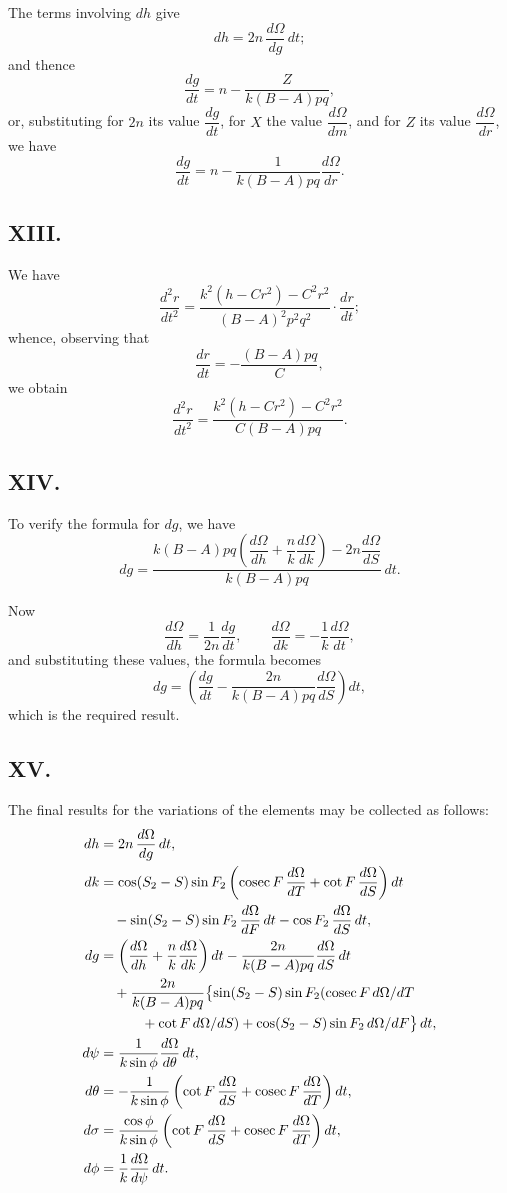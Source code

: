 \documentclass[11pt,a4paper]{article}
\DeclareMathOperator{\cosec}{cosec}
\begin{document}
The terms involving $dh$ give
\[
dh = 2n\,\frac{d\Omega}{dg}\,dt;
\]
and thence
\[
\frac{dg}{dt} = n - \frac{Z}{k(B-A)pq},
\]
or, substituting for $2n$ its value $\dfrac{dg}{dt}$, for $X$ the value $\dfrac{d\Omega}{dm}$, and for $Z$ its value $\dfrac{d\Omega}{dr}$, we have
\[
\frac{dg}{dt} = n - \frac{1}{k(B-A)pq}\frac{d\Omega}{dr}.
\]

\subsection*{XIII.}

We have
\[
\frac{d^2r}{dt^2} = \frac{k^2(h-Cr^2)-C^2r^2}{(B-A)^2p^2q^2}\cdot\frac{dr}{dt};
\]
whence, observing that
\[
\frac{dr}{dt} = -\frac{(B-A)pq}{C},
\]
we obtain
\[
\frac{d^2r}{dt^2} = \frac{k^2(h-Cr^2)-C^2r^2}{C(B-A)pq}.
\]

\subsection*{XIV.}

To verify the formula for $dg$, we have
\[
dg = \frac{k(B-A)pq\left(\dfrac{d\Omega}{dh} + \dfrac{n}{k}\dfrac{d\Omega}{dk}\right) - 2n\dfrac{d\Omega}{dS}}{k(B-A)pq}\,dt.
\]

Now
\[
\frac{d\Omega}{dh} = \frac{1}{2n}\frac{dg}{dt}, \qquad \frac{d\Omega}{dk} = -\frac{1}{k}\frac{d\Omega}{dt},
\]
and substituting these values, the formula becomes
\[
dg = \left(\frac{dg}{dt} - \frac{2n}{k(B-A)pq}\frac{d\Omega}{dS}\right)dt,
\]
which is the required result.

\subsection*{XV.}

The final results for the variations of the elements may be collected as follows:
\begin{align}
dh &= 2n\,\frac{d\Omega}{dg}\,dt, \\
dk &= \cos(S_2-S)\sin F_2\left(\cosec F\,\frac{d\Omega}{dT} + \cot F\,\frac{d\Omega}{dS}\right)dt \notag\\
&\quad - \sin(S_2-S)\sin F_2\,\frac{d\Omega}{dF}\,dt - \cos F_2\,\frac{d\Omega}{dS}\,dt, \\
dg &= \left(\frac{d\Omega}{dh} + \frac{n}{k}\frac{d\Omega}{dk}\right)dt - \frac{2n}{k(B-A)pq}\frac{d\Omega}{dS}\,dt \notag\\
&\quad + \frac{2n}{k(B-A)pq}\bigl\{\sin(S_2-S)\sin F_2(\cosec F\,d\Omega/dT \notag\\
&\quad\qquad + \cot F\,d\Omega/dS) + \cos(S_2-S)\sin F_2\,d\Omega/dF\bigr\}\,dt, \\
d\psi &= \frac{1}{k\sin\phi}\frac{d\Omega}{d\theta}\,dt, \\
d\theta &= -\frac{1}{k\sin\phi}\left(\cot F\,\frac{d\Omega}{dS} + \cosec F\,\frac{d\Omega}{dT}\right)dt, \\
d\sigma &= \frac{\cos\phi}{k\sin\phi}\left(\cot F\,\frac{d\Omega}{dS} + \cosec F\,\frac{d\Omega}{dT}\right)dt, \\
d\phi &= \frac{1}{k}\frac{d\Omega}{d\psi}\,dt.
\end{align}
\end{document}

